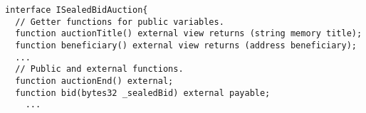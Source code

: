 \begin{lstlisting}[language=Solidity]
interface ISealedBidAuction{
  // Getter functions for public variables.
  function auctionTitle() external view returns (string memory title);
  function beneficiary() external view returns (address beneficiary); 
  ...
  // Public and external functions.
  function auctionEnd() external;
  function bid(bytes32 _sealedBid) external payable;
    ...
\end{lstlisting}